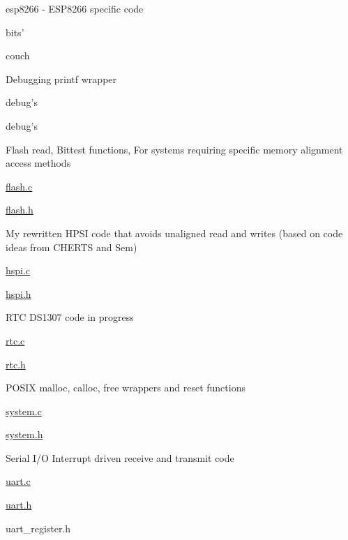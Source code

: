 esp8266 -\/ E\+S\+P8266 specific code
\begin{DoxyItemize}
\item bits’
\item couch
\item Debugging printf wrapper
\begin{DoxyItemize}
\item debug’s
\item debug’s
\end{DoxyItemize}
\item Flash read, Bittest functions, For systems requiring specific memory alignment access methods
\begin{DoxyItemize}
\item \hyperlink{flash_8c}{flash.\+c}
\item \hyperlink{flash_8h}{flash.\+h}
\end{DoxyItemize}
\item My rewritten H\+P\+SI code that avoids unaligned read and writes (based on code ideas from C\+H\+E\+R\+TS and Sem)
\begin{DoxyItemize}
\item \hyperlink{hspi_8c}{hspi.\+c}
\item \hyperlink{hspi_8h}{hspi.\+h}
\end{DoxyItemize}
\item R\+TC D\+S1307 code in progress
\begin{DoxyItemize}
\item \hyperlink{rtc_8c}{rtc.\+c}
\item \hyperlink{rtc_8h}{rtc.\+h}
\end{DoxyItemize}
\item P\+O\+S\+IX malloc, calloc, free wrappers and reset functions
\begin{DoxyItemize}
\item \hyperlink{system_8c}{system.\+c}
\item \hyperlink{system_8h}{system.\+h}
\end{DoxyItemize}
\item Serial I/O Interrupt driven receive and transmit code
\begin{DoxyItemize}
\item \hyperlink{uart_8c}{uart.\+c}
\item \hyperlink{uart_8h}{uart.\+h}
\item uart\+\_\+register.\+h
\end{DoxyItemize}
\end{DoxyItemize}

